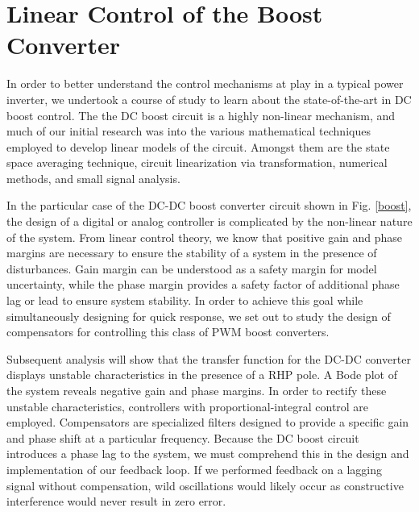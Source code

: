 
\chapter{Linear Control of the Boost Converter} %

\label{Chapter4} %


In order to better understand the control mechanisms at play in a typical power inverter, we undertook a course of study to learn about the state-of-the-art in DC boost control. The the DC boost circuit is a highly non-linear mechanism, and much of our initial research was into the various mathematical techniques employed to develop linear models of the circuit. Amongst them are the state space averaging technique, circuit linearization via transformation, numerical methods, and small signal analysis.

In the particular case of the DC-DC boost converter circuit shown in Fig. \ref{boost}, the design of a digital or analog controller is complicated by the non-linear nature of the system. From linear control theory, we know that positive gain and phase margins are necessary to ensure the stability of a system in the presence of disturbances. Gain margin can be understood as a safety margin for model uncertainty, while the phase margin provides a safety factor of additional phase lag or lead to ensure system stability. In order to achieve this goal while simultaneously designing for quick response, we set out to study the design of compensators for controlling this class of PWM boost converters. 

Subsequent analysis will show that the transfer function for the DC-DC converter displays unstable characteristics in the presence of a RHP pole. A Bode plot of the system reveals negative gain and phase margins. In order to rectify these unstable characteristics, controllers with proportional-integral control are employed. Compensators are specialized filters designed to provide a specific gain and phase shift at a particular frequency. Because the DC boost circuit introduces a phase lag to the system, we must comprehend this in the design and implementation of our feedback loop. If we performed feedback on a lagging signal without compensation, wild oscillations would likely occur as constructive interference would never result in zero error. 

